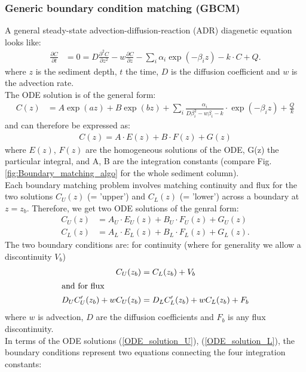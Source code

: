 \documentclass[gmd, manuscript]{copernicus}
\begin{document}
\subsubsection{Generic boundary condition matching (GBCM)}\label{subsec:GBCM}
A general steady-state advection-diffusion-reaction (ADR) diagenetic equation looks like:
\begin{align} 
 \frac{\partial C}{\partial t} &= 0 = D\frac{\partial^2C }{\partial z^2} - w\frac{\partial C }{\partial z} - \sum_i \alpha_i \exp(-\beta_i z) - k\cdot C + Q.
\end{align}
where $z$ is the sediment depth, $t$ the time, $D$ is the diffusion coefficient and $w$ is the advection rate.\\
The ODE solution is of the general form:
\begin{align}
 C(z) &= A \exp(az) + B  \exp(bz) + \sum_i \frac{\alpha_i}{D \beta_i^2-w\beta_i-k}\cdot \exp(-\beta_i z) + \frac{Q}{k} \label{eq:ODE_general_solution}
\end{align}
and can therefore be expressed as:
\begin{align}
C(z) = A \cdot E(z) + B \cdot F(z) + G(z) 
\end{align}
where $E(z)$, $F (z)$ are the homogeneous solutions of the ODE, G(z) the particular integral, and A, B are the integration constants (compare Fig. \ref{fig:Boundary_matching_algo} for the whole sediment column).\\[1em]
Each boundary matching problem involves matching continuity and flux for the two solutions $C_U(z)$ (= 'upper') and $C_L(z)$ (= 'lower') across a boundary at $z = z_b$. Therefore, we get two ODE solutions of the genral form:
\begin{align}
C_U(z) &= A_U \cdot E_U(z) + B_U \cdot F_U(z) + G_U(z) \label{ODE_solution_U}\\
C_L(z) &= A_L \cdot E_L(z) + B_L \cdot F_L(z) + G_L(z) .\label{ODE_solution_L}
\end{align}
The two boundary conditions are: for continuity (where for generality we allow a discontinuity $V_b$) 
\begin{align}
  C_U(z_b) &= C_L(z_b) + V_b	\\
\intertext{and for flux}
 D_U C_U'(z_b) + wC_U(z_b) &=  D_LC_L'(z_b) + wC_L(z_b) + F_b
\end{align}
where $w$ is advection, $D$ are the diffusion coefficients and $F_b$ is any flux discontinuity.\\[1em]
In terms of the ODE solutions (\ref{ODE_solution_U}), (\ref{ODE_solution_L}), the boundary conditions represent two equations connecting the four integration constants:\\
\end{document}
